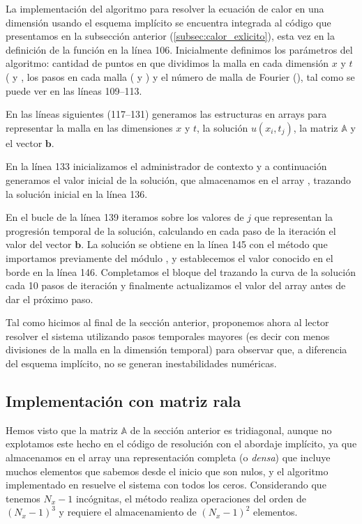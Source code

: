 La implementación del algoritmo para resolver la ecuación de calor en una dimensión usando el esquema implícito se encuentra integrada al código que presentamos en la subsección anterior (\ref{subsec:calor_exlicito}), esta vez en la definición de la función  en la línea 106. Inicialmente definimos los parámetros del algoritmo: cantidad de puntos en que dividimos la malla en cada dimensión $x$ y $t$ ( y , los pasos en cada malla ( y ) y el número de malla de Fourier (), tal como se puede ver en las líneas 109--113.


En las líneas siguientes (117--131) generamos las estructuras en arrays para representar la malla en las dimensiones $x$ y $t$, la solución $u(x_i, t_j)$, la matriz $\mathbb{A}$ y el vector $\bm{b}$.

En la línea 133 inicializamos el administrador de contexto y a continuación generamos el valor inicial de la solución, que almacenamos en el array , trazando la solución inicial en la línea 136.

En el bucle  de la línea 139 iteramos sobre los valores de $j$ que representan la progresión temporal de la solución, calculando en cada paso de la iteración el valor del vector $\bm{b}$. La solución se obtiene en la línea 145 con el método  que importamos previamente del módulo , y establecemos el valor conocido en el borde en la línea 146. Completamos el bloque del  trazando la curva de la solución cada 10 pasos de iteración y finalmente actualizamos el valor del array  antes de dar el próximo paso. 

Tal como hicimos al final de la sección anterior, proponemos ahora al lector resolver el sistema utilizando pasos temporales mayores (es decir con menos divisiones de la malla en la dimensión temporal) para observar que, a diferencia del esquema implícito, no se generan inestabilidades numéricas.

\subsection{Implementación con matriz rala}
Hemos visto que la matriz $\mathbb{A}$ de la sección anterior es tridiagonal, aunque no explotamos este hecho en el código de resolución con el abordaje implícito, ya que almacenamos en el array  una representación completa (o \textit{densa}) que incluye muchos elementos que sabemos desde el inicio que son nulos, y el algoritmo implementado en  resuelve el sistema con todos los ceros. Considerando que tenemos $N_x-1$ incógnitas, el método  realiza operaciones del orden de $(N_x -1)^3$ y requiere el almacenamiento de $(N_x - 1)^2$ elementos.

